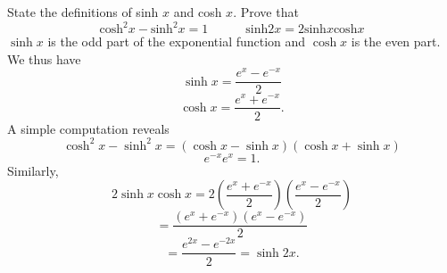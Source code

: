 State the definitions of sinh $x$ and cosh $x$. Prove that
\[
\text{cosh}^2x - \text{sinh}^2x = 1 \quad \quad \quad \text{sinh}2x = 2 \text{sinh}x\text{cosh}x
\]
\newline
$\sinh x$ is the odd part of the exponential function and $\cosh x$ is the even part. We thus have
\[
\sinh x = \frac{e^x-e^{-x}}{2}
\]
\[
\cosh x = \frac{e^x + e^{-x}}{2}.
\]
A simple computation reveals
\[
\cosh^2x - \sinh^2x = (\cosh x - \sinh x)(\cosh x + \sinh x)
\]
\[
e^{-x}e^x = 1.
\]
Similarly,
\[
2\sinh x\cosh x = 2\left(\frac{e^x+e^{-x}}{2}\right)\left(\frac{e^x-e^{-x}}{2}\right) 
\]
\[
= \frac{(e^x+e^{-x})(e^x -e^{-x})}{2}
\]
\[
= \frac{e^{2x} -e^{-2x}}{2} = \sinh 2x.
\]